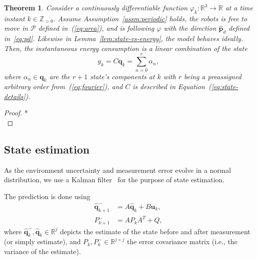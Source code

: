 \documentclass[letterpaper,10pt,conference]{ieeeconf}
\newtheorem{thm}{Theorem}[section]
\begin{document}
\begin{thm}\label{thm:state-vs-energy}
  Consider a continuously differentiable function $\varphi_k:\mathbb{R}^3\rightarrow\mathbb{R}$ at a time instant $k\in\mathbb{Z}_{>0}$.
  Assume Assumption~\ref{assm:periodic} holds, the robots is free to move in $\mathcal{P}$ defined in~(\ref{eq:area}), and is following $\varphi$ with the direction $\hat{\mathbf{p}}_d$ defined in~\ref{eq:pd}. Likewise in Lemma~\ref{lem:state-vs-energy}, the model behaves ideally. 
  Then, the instantaneous energy consumption is a linear combination of the state
  \begin{equation}
    y_k=C\mathbf{q}_k=\sum_{n=0}^r{\alpha_n},
  \end{equation}
  where $\alpha_n\in\mathbf{q}_k$ are the $r+1$ state's components at $k$ with $r$ being a preassigned arbitrary order from~(\ref{eq:fourier}), and $C$ is described in Equation~(\ref{eq:state-details}).
\end{thm}
\begin{proof}
  *\\
\end{proof}

\subsection{State estimation}
\label{sec:state-est}

As the environment uncertainty and measurement error evolve in a normal distribution, we use a Kalman filter~\cite{stengel1994optimal, simon2006optimal} for the purpose of state estimation. 

The prediction is done using
\begin{subequations}\label{eq:kalman-pred}\begin{align}
  \hat{\mathbf{q}}_{k+1}^-&=A\hat{\mathbf{q}}_{k}+B\mathbf{u}_k,\label{eq:kalman-pred1}\\
  P_{k+1}^-&=AP_kA^T+Q,\label{eq:kalman-pred2}
\end{align}\end{subequations}
where $\hat{\mathbf{q}}_k^-,\hat{\mathbf{q}}_k\in\mathbb{R}^j$ depicts the estimate of the state before and after measurement (or simply estimate), and $P_k,P_k^-\in\mathbb{R}^{j\times j}$ the error covariance matrix (i.e., the variance of the estimate). 
\end{document}

